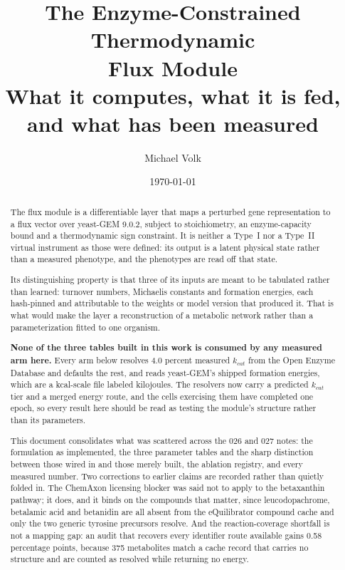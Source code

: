 \documentclass[10pt,a4paper]{article}
\title{\vspace{-1.5em}The Enzyme-Constrained Thermodynamic\\Flux Module\\
  {\large What it computes, what it is fed,\\and what has been measured}}
\author{Michael Volk}
\date{\today}
\begin{document}
\maketitle
\thispagestyle{empty}

\begin{abstract}
\noindent
The flux module is a differentiable layer that maps a perturbed gene representation to a
flux vector over yeast-GEM 9.0.2, subject to stoichiometry, an enzyme-capacity bound and a
thermodynamic sign constraint. It is neither a Type~I nor a Type~II virtual instrument as
those were defined: its output is a latent physical state rather than a measured phenotype,
and the phenotypes are read off that state.

Its distinguishing property is that three of its inputs are meant to be tabulated rather
than learned: turnover numbers, Michaelis constants and formation energies, each
hash-pinned and attributable to the weights or model version that produced it. That is what
would make the layer a reconstruction of a metabolic network rather than a parameterization
fitted to one organism.

\textbf{None of the three tables built in this work is consumed by any measured arm here.}
Every arm below resolves 4.0 percent measured $k_{cat}$ from the Open Enzyme Database and
defaults the rest, and reads yeast-GEM's shipped formation energies, which are a kcal-scale
file labeled kilojoules. The resolvers now carry a predicted $k_{cat}$ tier and a merged
energy route, and the cells exercising them have completed one epoch, so every result here
should be read as testing the module's structure rather than its parameters.

This document consolidates what was scattered across the 026 and 027 notes: the
formulation as implemented, the three parameter tables and the sharp distinction between
those wired in and those merely built, the ablation registry, and every measured number.
Two corrections to earlier claims are recorded rather than quietly folded in. The ChemAxon
licensing blocker was said not to apply to the betaxanthin pathway; it does, and it binds
on the compounds that matter, since leucodopachrome, betalamic acid and betanidin are all
absent from the eQuilibrator compound cache and only the two generic tyrosine precursors
resolve. And the reaction-coverage shortfall is not a mapping gap: an audit that recovers
every identifier route available gains 0.58 percentage points, because 375 metabolites
match a cache record that carries no structure and are counted as resolved while returning
no energy.


\end{abstract}
\end{document}
